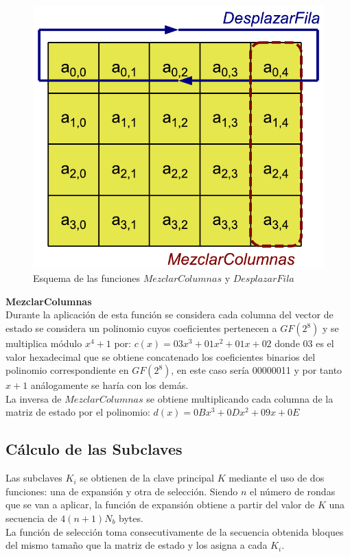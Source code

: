 \begin{description}
		\begin{figure}[htb]
			\centering
			\includegraphics[scale=0.4]{imagenes/aesdesplazarmezclar.png} 
			\caption{Esquema de las funciones $MezclarColumnas$ y $DesplazarFila$}
			\label{desplazarymezclar}
		\end{figure}
\newpage
	\item \textbf{MezclarColumnas}\\
		Durante la aplicación de esta función se considera cada columna del vector de estado se considera un polinomio cuyos coeficientes pertenecen a $GF(2^8)$ y se multiplica módulo $x^4+1$ por: $c(x)=03x^3+01x^2+01x+02$ donde 03 es el valor hexadecimal que se obtiene concatenado los coeficientes binarios del polinomio correspondiente en $GF(2^8)$, en este caso sería 00000011 y por tanto $x+1$ análogamente se haría con los demás.\\
		La inversa de $MezclarColumnas$ se obtiene multiplicando cada columna de la matriz de estado por el polinomio: $d(x)=0Bx^3+0Dx^2+09x+0E$

\end{description}

\subsection{Cálculo de las Subclaves}
Las subclaves $K_i$ se obtienen de la clave principal $K$ mediante el uso de dos funciones: una de expansión y otra de selección. Siendo $n$ el número de rondas que se van a aplicar, la función de expansión obtiene a partir del valor de $K$ una secuencia de $4(n+1)N_b$ bytes.\\
La función de selección toma consecutivamente de la secuencia obtenida bloques del mismo tamaño que la matriz de estado y los asigna a cada $K_i$.\\

